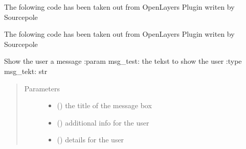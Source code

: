 \documentclass[letterpaper,10pt,english]{sphinxmanual}
\begin{document}
\begin{fulllineitems}
\begin{fulllineitems}
\end{fulllineitems}


\begin{fulllineitems}
\label{\detokenize{code:Tilgjengelighet.Tilgjengelighet.setMapCrs}}
The folowing code has been taken out from OpenLayers Plugin writen by Sourcepole

\end{fulllineitems}


\begin{fulllineitems}
\label{\detokenize{code:Tilgjengelighet.Tilgjengelighet.setReferenceLayer}}
The folowing code has been taken out from OpenLayers Plugin writen by Sourcepole

\end{fulllineitems}


\begin{fulllineitems}
\label{\detokenize{code:Tilgjengelighet.Tilgjengelighet.show_message}}
Show the user a message
:param msg\_test: the tekst to show the user
:type msg\_tekt: str
\begin{quote}\begin{description}
\item[{Parameters}] \leavevmode\begin{itemize}
\item {} 
 () \textendash{} the title of the message box

\item {} 
 () \textendash{} additional info for the user

\item {} 
 () \textendash{} details for the user


\end{itemize}
\end{description}
\end{quote}
\end{fulllineitems}
\end{fulllineitems}
\end{document}
